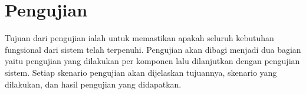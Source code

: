 \section{Pengujian}


Tujuan dari pengujian ialah untuk memastikan apakah seluruh kebutuhan fungsional dari sistem telah terpenuhi.
Pengujian akan dibagi menjadi dua bagian yaitu pengujian yang dilakukan per komponen lalu dilanjutkan dengan pengujian sistem. Setiap skenario pengujian akan dijelaskan tujuannya, skenario yang dilakukan, dan hasil pengujian yang didapatkan.










